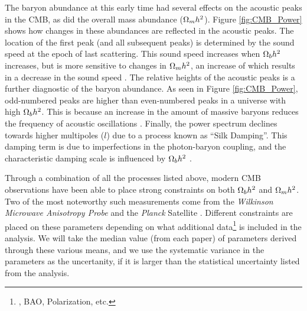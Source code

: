 The baryon abundance at this early time had several effects on the
acoustic peaks in the CMB, as did the overall mass abundance ($\Omega_m
h^2$). Figure \ref{fig:CMB_Power} shows how changes in these
abundances are reflected in the acoustic peaks. The location of the
first peak (and all subsequent peaks) is determined by the sound speed
at the epoch of last scattering. This sound speed increases when
$\Omega_b h^2$ increases, but is more sensitive to changes in $\Omega_m
h^2$, an increase of which results in a decrease in the sound speed
\citep[][ch.~9.8]{Mukhanov2005}. The relative heights of the acoustic
peaks is a further diagnostic of the baryon abundance. As seen in
Figure \ref{fig:CMB_Power}, odd-numbered peaks are higher than
even-numbered peaks in a universe with high $\Omega_b h^2$. This is
because an increase in the amount of massive baryons reduces the
frequency of acoustic oscillations
\citep[][ch.~8.7.3]{Dodelson2003}. Finally, the power spectrum
declines towards higher multipoles ($l$) due to a process known as
``Silk Damping''. This damping term is due to imperfections in the
photon-baryon coupling, and the characteristic damping scale is
influenced by $\Omega_b h^2$ \citep[][ch.~4.7]{Durrer2008}.



Through a combination of all the processes listed above, modern CMB
observations have been able to place strong constraints on both
$\Omega_b h^2$ and $\Omega_m h^2$. Two of the most noteworthy such
measurements come from the \textit{Wilkinson Microwave Anisotropy
  Probe} \citep[WMAP][]{Bennett2003} and the \textit{Planck} Satellite
\citep{PlanckResultsI}. Different constraints are placed on these
parameters depending on what additional data\footnote{\Ho, BAO,
  Polarization, etc.} is included in the analysis. We will take the
median value (from each paper) of parameters derived through these
various means, and we use the systematic variance in the parameters as
the uncertanity, if it is larger than the statistical uncertainty
listed from the analysis.

